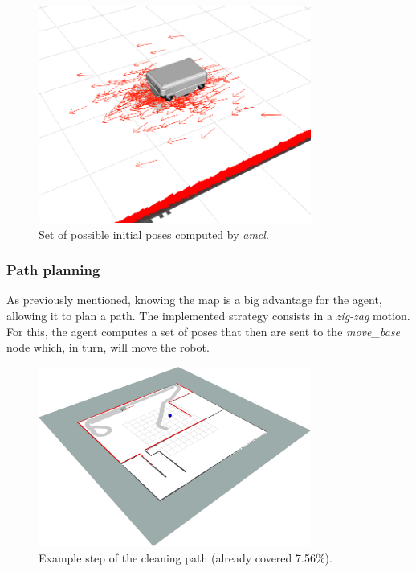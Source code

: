 \documentclass[]{article}
\begin{document}
\begin{figure}[ht]
    \centering
    \includegraphics[width=0.8\textwidth]{imgs/amcl_init.png}
    \caption{Set of possible initial poses computed by \textit{amcl}.}
    \label{fig:amcl_init}
\end{figure}

\subsubsection{Path planning}

As previously mentioned, knowing the map is a big advantage for the agent, allowing it to plan a path. The implemented strategy consists in a \textit{zig-zag} motion. For this, the agent computes a set of poses that then are sent to the \textit{move\_base} node which, in turn, will move the robot. 

\begin{figure}[ht]
    \centering
    \includegraphics[width=0.8\textwidth]{imgs/cleanned_0.0756.png}
    \caption{Example step of the cleaning path (already covered 7.56\%).}
    \label{fig:cleaning_path}
\end{figure}
\end{document}
